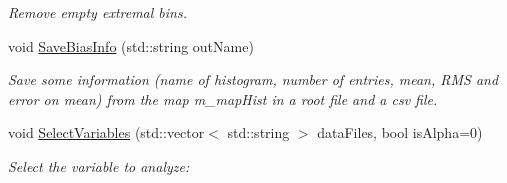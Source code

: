 \begin{DoxyCompactItemize}
\begin{DoxyCompactList}\small\item\em Remove empty extremal bins. \end{DoxyCompactList}\item 
void \hyperlink{classBiasAnalysis_a2a4e0023805dfb6a00a288d976c1cc61}{Save\+Bias\+Info} (std\+::string out\+Name)
\begin{DoxyCompactList}\small\item\em Save some information (name of histogram, number of entries, mean, R\+M\+S and error on mean) from the map m\+\_\+map\+Hist in a root file and a csv file. \end{DoxyCompactList}\item 
void \hyperlink{classBiasAnalysis_ad440a31c27ff6be1e4ec9c0303bfa4e6}{Select\+Variables} (std\+::vector$<$ std\+::string $>$ data\+Files, bool is\+Alpha=0)
\begin{DoxyCompactList}\small\item\em Select the variable to analyze\+: \end{DoxyCompactList}\end{DoxyCompactItemize}

